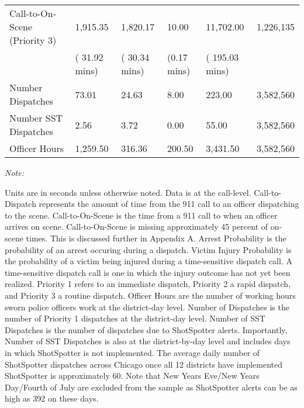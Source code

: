 \begin{table}[H]
\begin{threeparttable}
\begin{tabular}[t]{llllll}
\hspace{1em}Call-to-On-Scene (Priority 3) & 1,915.35 & 1,820.17 & 10.00 & 11,702.00 & 1,226,135\\
 & (   31.92 mins) & (   30.34 mins) & (0.17 mins) & (   195.03 mins) & \\
Number Dispatches & 73.01 & 24.63 & 8.00 & 223.00 & 3,582,560\\
Number SST Dispatches & 2.56 & 3.72 & 0.00 & 55.00 & 3,582,560\\
Officer Hours & 1,259.50 & 316.36 & 200.50 & 3,431.50 & 3,582,560\\
\bottomrule
\end{tabular}
\begin{tablenotes}
\item \textit{Note: } 
\item Units are in seconds unless otherwise noted. Data is at         the call-level. Call-to-Dispatch represents          the amount of time from the 911 call to an officer dispatching         to the scene. Call-to-On-Scene is the time from a 911 call to         when an officer arrives on scene.         Call-to-On-Scene is missing approximately 45 percent         of on-scene times. This is discussed further in Appendix A.         Arrest Probability is the probability of         an arrest occuring during a dispatch.         Victim Injury Probability is the probability of a victim being injured         during a time-sensitive dispatch call. A time-sensitive dispatch call is one         in which the injury outcome has not yet been realized.         Priority 1 refers to an immediate dispatch,          Priority 2 a rapid dispatch, and Priority 3 a routine dispatch. Officer Hours are the          number of working hours sworn police officers work at the district-day level.          Number of Dispatches is the number of Priority 1 dispatches at the         district-day level.         Number of SST Dispatches is the          number of dispatches due to ShotSpotter alerts. Importantly, Number of SST Dispatches is         also at the district-by-day level and includes days in which         ShotSpotter is not implemented. The average daily number of ShotSpotter dispatches across Chicago         once all 12 districts have implemented ShotSpotter is approximately 60. Note that         New Years Eve/New Years Day/Fourth of July are excluded from the sample as         ShotSpotter alerts can be as high as 392 on these days.                   
\end{tablenotes}
\end{threeparttable}
\end{table}
